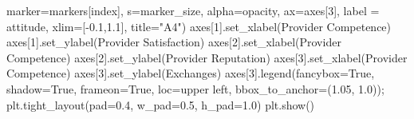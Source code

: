 \documentclass[
  letterpaper,
  DIV=11,
  numbers=noendperiod]{scrartcl}
\newenvironment{Shaded}{\begin{snugshade}}{\end{snugshade}}
\newcommand{\DecValTok}[1]{\textcolor[rgb]{0.68,0.00,0.00}{#1}}
\newcommand{\FloatTok}[1]{\textcolor[rgb]{0.68,0.00,0.00}{#1}}
\newcommand{\NormalTok}[1]{\textcolor[rgb]{0.00,0.23,0.31}{#1}}
\newcommand{\OperatorTok}[1]{\textcolor[rgb]{0.37,0.37,0.37}{#1}}
\newcommand{\StringTok}[1]{\textcolor[rgb]{0.13,0.47,0.30}{#1}}
\newcommand{\VariableTok}[1]{\textcolor[rgb]{0.07,0.07,0.07}{#1}}
\begin{document}
\begin{Shaded}
\begin{Highlighting}[]
\NormalTok{            marker}\OperatorTok{=}\NormalTok{markers[index], s}\OperatorTok{=}\NormalTok{marker\_size, alpha}\OperatorTok{=}\NormalTok{opacity, }
\NormalTok{            ax}\OperatorTok{=}\NormalTok{axes[}\DecValTok{3}\NormalTok{], label }\OperatorTok{=}\NormalTok{ attitude, xlim}\OperatorTok{=}\NormalTok{[}\OperatorTok{{-}}\FloatTok{0.1}\NormalTok{,}\FloatTok{1.1}\NormalTok{], title}\OperatorTok{=}\StringTok{"A4"}\NormalTok{)}
\NormalTok{    axes[}\DecValTok{1}\NormalTok{].set\_xlabel(}\StringTok{\textquotesingle{}Provider Competence\textquotesingle{}}\NormalTok{)}
\NormalTok{    axes[}\DecValTok{1}\NormalTok{].set\_ylabel(}\StringTok{\textquotesingle{}Provider Satisfaction\textquotesingle{}}\NormalTok{)}
\NormalTok{    axes[}\DecValTok{2}\NormalTok{].set\_xlabel(}\StringTok{\textquotesingle{}Provider Competence\textquotesingle{}}\NormalTok{)}
\NormalTok{    axes[}\DecValTok{2}\NormalTok{].set\_ylabel(}\StringTok{\textquotesingle{}Provider Reputation\textquotesingle{}}\NormalTok{)}
\NormalTok{    axes[}\DecValTok{3}\NormalTok{].set\_xlabel(}\StringTok{\textquotesingle{}Provider Competence\textquotesingle{}}\NormalTok{)}
\NormalTok{    axes[}\DecValTok{3}\NormalTok{].set\_ylabel(}\StringTok{\textquotesingle{}Exchanges\textquotesingle{}}\NormalTok{)}
\NormalTok{    axes[}\DecValTok{3}\NormalTok{].legend(fancybox}\OperatorTok{=}\VariableTok{True}\NormalTok{, shadow}\OperatorTok{=}\VariableTok{True}\NormalTok{, frameon}\OperatorTok{=}\VariableTok{True}\NormalTok{, }
\NormalTok{                   loc}\OperatorTok{=}\StringTok{\textquotesingle{}upper left\textquotesingle{}}\NormalTok{, bbox\_to\_anchor}\OperatorTok{=}\NormalTok{(}\FloatTok{1.05}\NormalTok{, }\FloatTok{1.0}\NormalTok{))}\OperatorTok{;}
\NormalTok{    plt.tight\_layout(pad}\OperatorTok{=}\FloatTok{0.4}\NormalTok{, w\_pad}\OperatorTok{=}\FloatTok{0.5}\NormalTok{, h\_pad}\OperatorTok{=}\FloatTok{1.0}\NormalTok{)}
\NormalTok{    plt.show()   }
    

\end{Highlighting}
\end{Shaded}
\end{document}
